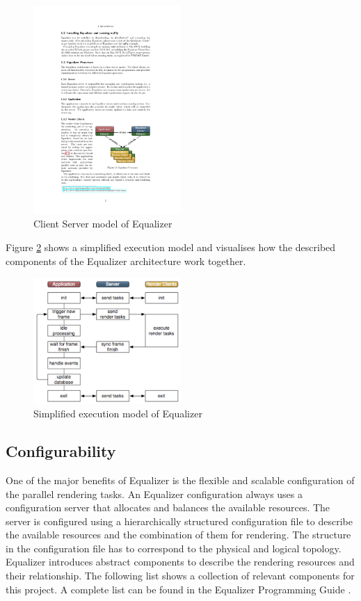 \begin{figure}[H]
	\centering
	\includegraphics[width=0.5\textwidth]{../figures/eqClientServerModel}
	\caption{Client Server model of Equalizer\cite[p. 2]{eqPG}}
	\label{fig:eqClientServerModel}
\end{figure}

Figure \ref{fig:executionModel}\cite{eqPG} shows a simplified execution model and visualises how the described components of the Equalizer architecture work together.

\begin{figure}[H]
	\centering
	\includegraphics[width=0.5\textwidth]{../figures/equalizer_execution_flow}
	\caption{Simplified execution model of Equalizer\cite[p. 9]{eqPG}}
	\label{fig:executionModel}
\end{figure}

\subsection{Configurability}
\label{sec:configurability}
One of the major benefits of Equalizer is the flexible and scalable configuration of the parallel rendering tasks. An Equalizer configuration always uses a configuration server that allocates and balances the available resources. The server is configured using a hierarchically structured configuration file to describe the available resources and the combination of them for rendering. The structure in the configuration file has to correspond to the physical and logical topology. Equalizer introduces abstract components to describe the rendering resources and their relationship. The following list shows a collection of relevant components for this project. A complete list can be found in the Equalizer Programming Guide \cite[p. 55ff]{eqPG}.


